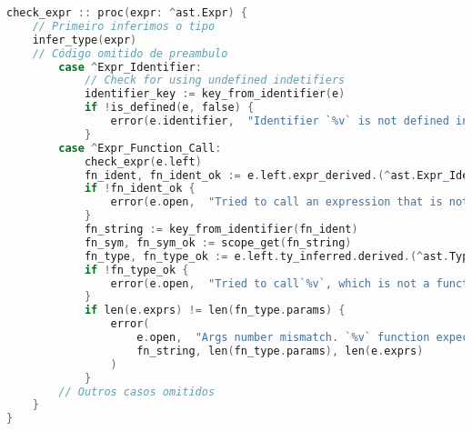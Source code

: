 \begin{codigo}[H]
    \caption{\small Recorte da função \texttt{check\_expr}. }
    \label{eq-function-check-expr}
\begin{lstlisting}[language=C, basicstyle=\ttfamily\footnotesize, frame=none, inputencoding=utf8]
check_expr :: proc(expr: ^ast.Expr) {
    // Primeiro inferimos o tipo
    infer_type(expr)
    // Código omitido de preambulo
        case ^Expr_Identifier:
            // Check for using undefined indetifiers
            identifier_key := key_from_identifier(e)
            if !is_defined(e, false) {
                error(e.identifier,  "Identifier `%v` is not defined in the current scope.", identifier_key)
            }
        case ^Expr_Function_Call:
            check_expr(e.left)
            fn_ident, fn_ident_ok := e.left.expr_derived.(^ast.Expr_Identifier)
            if !fn_ident_ok {
                error(e.open,  "Tried to call an expression that is not an identifier")
            }
            fn_string := key_from_identifier(fn_ident)
            fn_sym, fn_sym_ok := scope_get(fn_string)
            fn_type, fn_type_ok := e.left.ty_inferred.derived.(^ast.Type_Function)
            if !fn_type_ok {
                error(e.open,  "Tried to call`%v`, which is not a function. Its type is `%v`", fn_string, format_type(e.left.ty_inferred))
            }
            if len(e.exprs) != len(fn_type.params) {
                error(
                    e.open,  "Args number mismatch. `%v` function expects  `%v` arguments but `%v` were given.",
                    fn_string, len(fn_type.params), len(e.exprs)
                )
            }
        // Outros casos omitidos
    }
}

\end{lstlisting}
\end{codigo}
